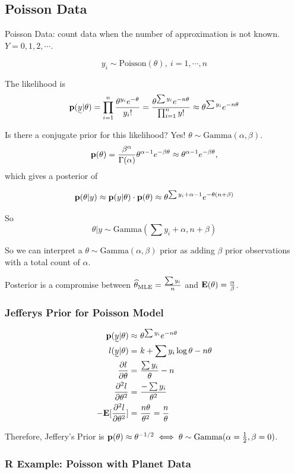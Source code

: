 \subsection{Poisson Data}
Poisson Data: count data when the number of approximation is not known. $Y=0, 1, 2, \cdots$.

\[
y_i \sim \text{Poisson}(\theta), ~i=1, \cdots, n
\]

The likelihood is 
\[
\p(\vec{y}|\theta) 
= \prod_{i=1}^n \frac{\theta^{y_i} e^{-\theta}}{y_i!} 
= \frac{\theta^{\sum y_i} e^{-n\theta}}{\prod_{i=1}^n y!}
\approx \theta^{\sum y_i} e^{-n \theta}
\]

Is there a conjugate prior for this likelihood? Yes! $\theta \sim \text{Gamma}(\alpha, \beta)$.
\[
{\mathbf p}(\theta) = \frac{\beta^{\alpha}}{\Gamma(\alpha)} \theta^{\alpha-1} e^{-\beta \theta} \approx \theta^{\alpha-1} e^{-\beta \theta},
\]
which gives a posterior of 

\[
{\mathbf p}(\theta|y) \approx {\mathbf p}(y|\theta) \cdot {\mathbf p}(\theta) \approx \theta^{\sum y_i + \alpha - 1} e^{-\theta(n+\beta)}
\]

So 
\[
\theta|y \sim \text{Gamma}(\sum y_i + \alpha, n + \beta)
\]

So we can interpret a $\theta \sim \text{Gamma}(\alpha, \beta)$ prior as adding $\beta$ prior observations with a total count of $\alpha$.

Posterior is a compromise between $\widehat \theta_{\text{MLE}} = \frac{\sum y_i}{n}$ and ${\mathbf E}(\theta) = \frac{\alpha}{\beta}$.

\subsubsection{Jefferys Prior for Poisson Model}
\begin{align*}
    \p(\vec{y}| \theta) \approx& ~\theta^{\sum y_i} e^{-n\theta}\\
    l(\vec{y}|\theta) =& ~k + \sum y_i \log \theta - n \theta\\
    \pdv{l}{\theta} =&~ \frac{\sum y_i}{\theta} - n\\
    \pdv[2]{l}{\theta} =&~ \frac{-\sum y_i}{\theta^2}\\
    -\E[\pdv[2]{l}{\theta}] =&~ \frac{n\theta}{\theta^2} = \frac{n}{\theta}
\end{align*}

Therefore, Jeffery's Prior is ${\mathbf p}(\theta) \approx \theta^{-1/2} \iff \theta \sim \text{Gamma}(\alpha=\frac{1}{2}, \beta=0)$.

\subsubsection{R Example: Poisson with Planet Data}

